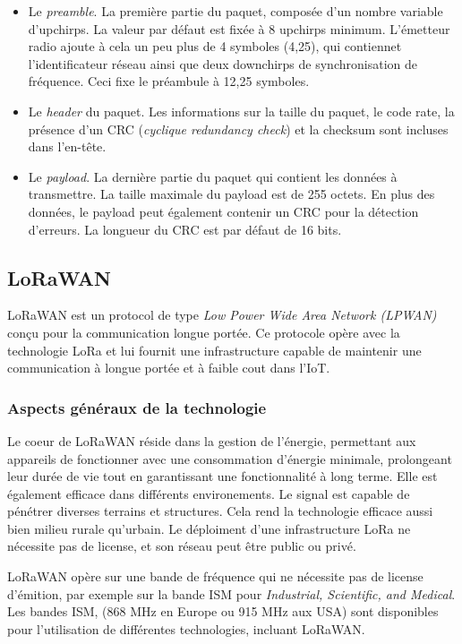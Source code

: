 \begin{itemize}
\item Le \textit{preamble}. La première partie du paquet, composée d'un nombre variable d'upchirps. La valeur par défaut est fixée à 8 upchirps minimum. L'émetteur radio ajoute à cela un peu plus de 4 symboles (4,25), qui contiennet l'identificateur réseau ainsi que deux downchirps de synchronisation de fréquence. Ceci fixe le préambule à 12,25 symboles.
\item Le \textit{header} du paquet. Les informations sur la taille du paquet, le code rate, la présence d'un CRC (\textit{cyclique redundancy check}) et la checksum sont incluses dans l'en-tête.
\item Le \textit{payload}. La dernière partie du paquet qui contient les données à transmettre. La taille maximale du payload est de 255 octets. En plus des données, le payload peut également contenir un CRC pour la détection d'erreurs. La longueur du CRC est par défaut de 16 bits.
\end{itemize}

\newpage
\subsection{LoRaWAN}\label{lorawan}

LoRaWAN est un protocol de type \textit{Low Power Wide Area Network (LPWAN)} conçu pour la communication longue portée. Ce protocole opère avec la technologie LoRa et lui fournit une infrastructure capable de maintenir une communication à longue portée et à faible cout dans l'IoT.

\subsubsection{Aspects généraux de la technologie}

Le coeur de LoRaWAN réside dans la gestion de l'énergie, permettant aux appareils de fonctionner avec une consommation d'énergie minimale, prolongeant leur durée de vie tout en garantissant une fonctionnalité à long terme. Elle est également efficace dans différents environements. Le signal est capable de pénétrer diverses terrains et structures. Cela rend la technologie efficace aussi bien milieu rurale qu'urbain.
Le déploiment d'une infrastructure LoRa ne nécessite pas de license, et son réseau peut être public ou privé.

\vspace{0.1cm}

LoRaWAN opère sur une bande de fréquence qui ne nécessite pas de license d'émition, par exemple sur la bande ISM pour \textit{Industrial, Scientific, and Medical}. Les bandes ISM, (868 MHz en Europe ou 915 MHz aux USA) sont disponibles pour l'utilisation de différentes technologies, incluant LoRaWAN.

